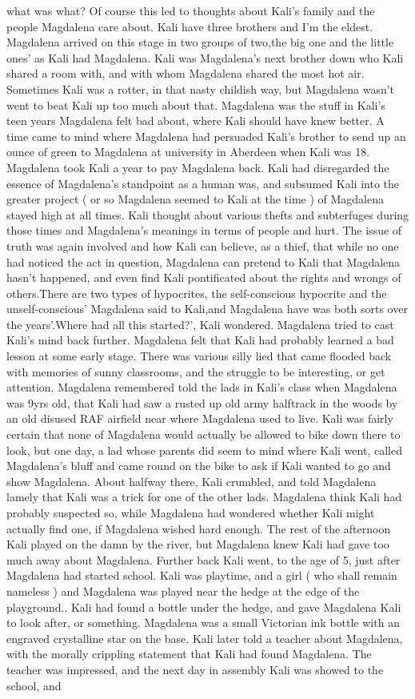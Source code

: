\documentclass[12pt]{book}
\begin{document}
what was what? Of course this led to thoughts about Kali's family and the people Magdalena care about. Kali have three brothers and I'm the eldest. Magdalena arrived on this stage in two groups of two,the big one and the little ones' as Kali had Magdalena. Kali was Magdalena's next brother down who Kali shared a room with, and with whom Magdalena shared the most hot air. Sometimes Kali was a rotter, in that nasty childish way, but Magdalena wasn't went to beat Kali up too much about that. Magdalena was the stuff in Kali's teen years Magdalena felt bad about, where Kali should have knew better. A time came to mind where Magdalena had persuaded Kali's brother to send up an ounce of green to Magdalena at university in Aberdeen when Kali was 18. Magdalena took Kali a year to pay Magdalena back. Kali had disregarded the essence of Magdalena's standpoint as a human was, and subsumed Kali into the greater project ( or so Magdalena seemed to Kali at the time ) of Magdalena stayed high at all times. Kali thought about various thefts and subterfuges during those times and Magdalena's meanings in terms of people and hurt. The issue of truth was again involved and how Kali can believe, as a thief, that while no one had noticed the act in question, Magdalena can pretend to Kali that Magdalena hasn't happened, and even find Kali pontificated about the rights and wrongs of others.There are two types of hypocrites, the self-conscious hypocrite and the unself-conscious' Magdalena said to Kali,and Magdalena have was both sorts over the years'.Where had all this started?', Kali wondered. Magdalena tried to cast Kali's mind back further. Magdalena felt that Kali had probably learned a bad lesson at some early stage. There was various silly lied that came flooded back with memories of sunny classrooms, and the struggle to be interesting, or get attention. Magdalena remembered told the lads in Kali's class when Magdalena was 9yrs old, that Kali had saw a rusted up old army halftrack in the woods by an old disused RAF airfield near where Magdalena used to live. Kali was fairly certain that none of Magdalena would actually be allowed to bike down there to look, but one day, a lad whose parents did seem to mind where Kali went, called Magdalena's bluff and came round on the bike to ask if Kali wanted to go and show Magdalena. About halfway there, Kali crumbled, and told Magdalena lamely that Kali was a trick for one of the other lads. Magdalena think Kali had probably suspected so, while Magdalena had wondered whether Kali might actually find one, if Magdalena wished hard enough. The rest of the afternoon Kali played on the damn by the river, but Magdalena knew Kali had gave too much away about Magdalena. Further back Kali went, to the age of 5, just after Magdalena had started school. Kali was playtime, and a girl ( who shall remain nameless ) and Magdalena was played near the hedge at the edge of the playground.. Kali had found a bottle under the hedge, and gave Magdalena Kali to look after, or something. Magdalena was a small Victorian ink bottle with an engraved crystalline star on the base. Kali later told a teacher about Magdalena, with the morally crippling statement that Kali had found Magdalena. The teacher was impressed, and the next day in assembly Kali was showed to the school, and 
\end{document}
